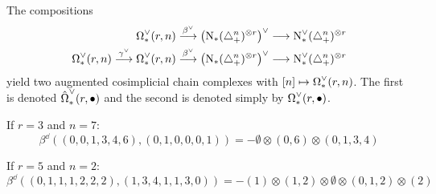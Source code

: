 The compositions
\begin{align*}
	\operatorname{\Omega}^{\vee}_{*}(r,n)&\overset{\beta^\vee}{\longrightarrow} \left(\operatorname{N}_{*}(\triangle_{+}^n)^{\otimes r}\right)^\vee \longrightarrow \operatorname{N}^\vee_{*}(\triangle_{+}^n)^{\otimes r}
	\\
	\operatorname{\Omega}^{\vee}_{*}(r,n)\overset{\gamma^\vee}{\longrightarrow}	\operatorname{\Omega}^{\vee}_{*}(r,n)&\overset{\beta^\vee}{\longrightarrow} \left(\operatorname{N}_{*}(\triangle_{+}^n)^{\otimes r}\right)^\vee \longrightarrow \operatorname{N}^\vee_{*}(\triangle_{+}^n)^{\otimes r}
\end{align*}
	yield two augmented cosimplicial chain complexes with $[n]\mapsto \operatorname{\Omega}^{\vee}_{*}(r,n)$. The first is denoted $\hat{\operatorname{\Omega}}^{\vee}_{*}(r,\bullet)$ and the second is denoted simply by $\operatorname{\Omega}^{\vee}_{*}(r,\bullet)$.
\begin{example}\label{example:betadual3} If $r=3$ and $n=7$:
\[
		\beta^\dd((0,0,1,3,4,6),(0,1,0,0,0,1)) = -\emptyset\otimes (0,6)\otimes (0,1,3,4)
	\]
	\end{example}
	\begin{example}\label{example:betadual5} If $r=5$ and $n=2$:
	\[
		\beta^\dd((0,1,1,1,2,2,2),(1,3,4,1,1,3,0)) = -(1)\otimes (1,2)\otimes \emptyset\otimes (0,1,2)\otimes (2)
	\]
	\end{example}


